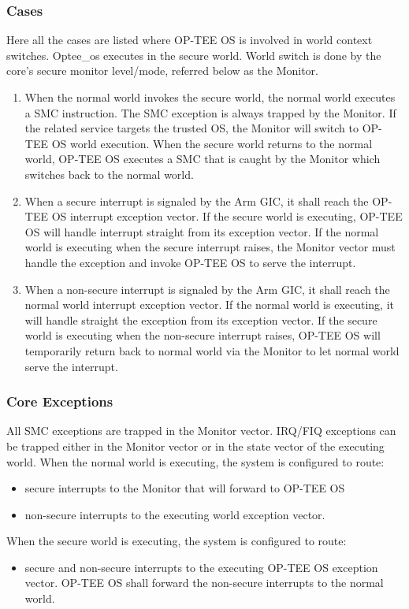 \documentclass{article}
\begin{document}
\subsubsection{Cases}

Here all the cases are listed where OP-TEE OS is involved in world context switches. Optee\_os executes in the secure world. World switch is done by the core’s secure monitor level/mode, referred below as the Monitor.
\begin{enumerate}
\item When the normal world invokes the secure world, the normal world executes a SMC instruction. The SMC exception is always trapped by the Monitor. If the related service targets the trusted OS, the Monitor will switch to OP-TEE OS world execution. When the secure world returns to the normal world, OP-TEE OS executes a SMC that is caught by the Monitor which switches back to the normal world.
\item When a secure interrupt is signaled by the Arm GIC, it shall reach the OP-TEE OS interrupt exception vector. If the secure world is executing, OP-TEE OS will handle interrupt straight from its exception vector. If the normal world is executing when the secure interrupt raises, the Monitor vector must handle the exception and invoke OP-TEE OS to serve the interrupt.
\item When a non-secure interrupt is signaled by the Arm GIC, it shall reach the normal world interrupt exception vector. If the normal world is executing, it will handle straight the exception from its exception vector. If the secure world is executing when the non-secure interrupt raises, OP-TEE OS will temporarily return back to normal world via the Monitor to let normal world serve the interrupt.
\end{enumerate}

\subsubsection{Core Exceptions}

All SMC exceptions are trapped in the Monitor vector. IRQ/FIQ exceptions can be trapped either in the Monitor vector or in the state vector of the executing world. When the normal world is executing, the system is configured to route:
\begin{itemize}
\item secure interrupts to the Monitor that will forward to OP-TEE OS
\item non-secure interrupts to the executing world exception vector.
\end{itemize}
When the secure world is executing, the system is configured to route:
\begin{itemize}
\item secure and non-secure interrupts to the executing OP-TEE OS exception vector. OP-TEE OS shall forward the non-secure interrupts to the normal world.
\end{itemize}
\end{document}
